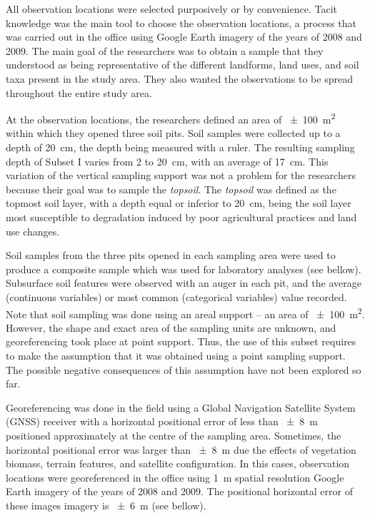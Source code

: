 All observation locations were selected purposively or by convenience. Tacit knowledge was the main tool
to choose the observation locations, a process that was carried out in the office using Google 
Earth\textregistered{} imagery of the years of 2008 and 2009. The main goal of the researchers was 
to obtain a sample that they understood as being representative of the different landforms, land uses, and 
soil taxa present in the study area. They also wanted the observations to be spread throughout the entire 
study area.

At the observation locations, the researchers defined an area of \SI{\pm100}{\metre\squared} within which
they opened three soil pits. Soil samples were collected up to a depth of \SI{20}{\centi\metre}, the depth 
being measured with a ruler. The resulting sampling depth of Subset I varies from \num{2} to 
\SI{20}{\centi\metre}, with an average of \SI{17}{\centi\metre}. This variation of the vertical sampling 
support was not a problem for the researchers because their goal was to sample the \emph{topsoil}. The
\emph{topsoil} was defined as the topmost soil layer, with a depth equal or inferior to 
\SI{20}{\centi\metre}, being the soil layer most susceptible to degradation induced by poor agricultural 
practices and land use changes.

Soil samples from the three pits opened in each sampling area were used to produce a composite sample
which was used for laboratory analyses (see bellow). Subsurface soil features were observed with an auger 
in each pit, and the average (continuous variables) or most common (categorical variables) value recorded.
Note that soil sampling was done using an areal support -- an area of \SI{\pm100}{\metre\squared}. However, 
the shape and exact area of the sampling units are unknown, and georeferencing took place at point 
support. Thus, the use of this subset requires to make the assumption that it was obtained using a point
sampling support. The possible negative consequences of this assumption have not been explored so far.

Georeferencing was done in the field using a Global Navigation Satellite System (GNSS) receiver with a 
horizontal positional error of less than \SI{\pm8}{\metre} positioned approximately at the centre of the
sampling area. Sometimes, the horizontal positional error was larger than \SI{\pm8}{\metre} due the effects
of vegetation biomass, terrain features, and satellite configuration. In this cases, observation locations 
were georeferenced in the office using \SI{1}{\metre} spatial resolution Google Earth\textregistered{} 
imagery of the years of 2008 and 2009. The positional horizontal error of these images imagery is 
\SI{\pm6}{\metre} (see bellow).

